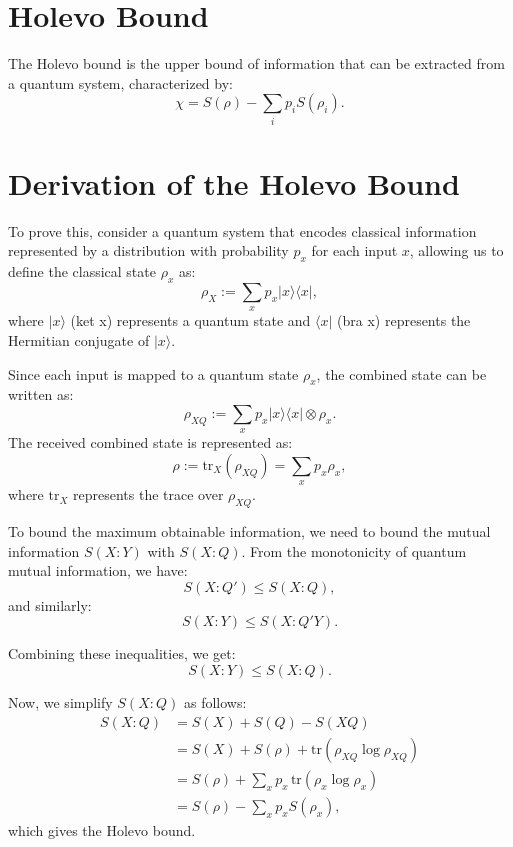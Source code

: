 \section{Holevo Bound}
The Holevo bound is the upper bound of information that can be extracted from a quantum system, characterized by:
\[
\chi = S(\rho) - \sum_i p_i S(\rho_i).
\]

\section{Derivation of the Holevo Bound}
To prove this, consider a quantum system that encodes classical information represented by a distribution with probability \( p_x \) for each input \( x \), allowing us to define the classical state \( \rho_x \) as:
\[
\rho_X := \sum_x p_x |x\rangle \langle x|,
\]
where \( |x\rangle \) (ket x) represents a quantum state and \( \langle x| \) (bra x) represents the Hermitian conjugate of \( |x\rangle \).

Since each input is mapped to a quantum state \( \rho_x \), the combined state can be written as:
\[
\rho_{XQ} := \sum_x p_x |x\rangle \langle x| \otimes \rho_x.
\]
The received combined state is represented as:
\[
\rho := \text{tr}_X(\rho_{XQ}) = \sum_x p_x \rho_x,
\]
where \( \text{tr}_X \) represents the trace over \( \rho_{XQ} \).

To bound the maximum obtainable information, we need to bound the mutual information \( S(X : Y) \) with \( S(X : Q) \). From the monotonicity of quantum mutual information, we have:
\[
S(X : Q') \leq S(X : Q),
\]
and similarly:
\[
S(X : Y) \leq S(X : Q'Y).
\]

Combining these inequalities, we get:
\[
S(X : Y) \leq S(X : Q).
\]

Now, we simplify \( S(X : Q) \) as follows:
\begin{align*}
S(X : Q) &= S(X) + S(Q) - S(XQ) \\
         &= S(X) + S(\rho) + \text{tr}(\rho_{XQ} \log \rho_{XQ}) \\
         &= S(\rho) + \sum_x p_x \, \text{tr}(\rho_x \log \rho_x) \\
         &= S(\rho) - \sum_x p_x S(\rho_x),
\end{align*}
which gives the Holevo bound.
